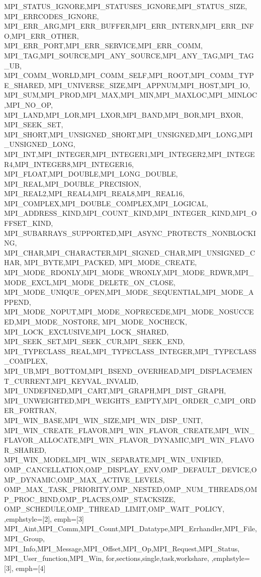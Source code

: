 {{    MPI_STATUS_IGNORE,MPI_STATUSES_IGNORE,MPI_STATUS_SIZE,
    MPI_ERRCODES_IGNORE,
    MPI_ERR_ARG,MPI_ERR_BUFFER,MPI_ERR_INTERN,MPI_ERR_INFO,MPI_ERR_OTHER,
    MPI_ERR_PORT,MPI_ERR_SERVICE,MPI_ERR_COMM,
    MPI_TAG,MPI_SOURCE,MPI_ANY_SOURCE,MPI_ANY_TAG,MPI_TAG_UB,
    MPI_COMM_WORLD,MPI_COMM_SELF,MPI_ROOT,MPI_COMM_TYPE_SHARED,
    MPI_UNIVERSE_SIZE,MPI_APPNUM,MPI_HOST,MPI_IO,
    MPI_SUM,MPI_PROD,MPI_MAX,MPI_MIN,MPI_MAXLOC,MPI_MINLOC,MPI_NO_OP,
    MPI_LAND,MPI_LOR,MPI_LXOR,MPI_BAND,MPI_BOR,MPI_BXOR,
    MPI_SEEK_SET,
    MPI_SHORT,MPI_UNSIGNED_SHORT,MPI_UNSIGNED,MPI_LONG,MPI_UNSIGNED_LONG,
    MPI_INT,MPI_INTEGER,MPI_INTEGER1,MPI_INTEGER2,MPI_INTEGER4,MPI_INTEGER8,MPI_INTEGER16,
    MPI_FLOAT,MPI_DOUBLE,MPI_LONG_DOUBLE,
    MPI_REAL,MPI_DOUBLE_PRECISION,
    MPI_REAL2,MPI_REAL4,MPI_REAL8,MPI_REAL16,
    MPI_COMPLEX,MPI_DOUBLE_COMPLEX,MPI_LOGICAL,
    MPI_ADDRESS_KIND,MPI_COUNT_KIND,MPI_INTEGER_KIND,MPI_OFFSET_KIND,
    MPI_SUBARRAYS_SUPPORTED,MPI_ASYNC_PROTECTS_NONBLOCKING,
    MPI_CHAR,MPI_CHARACTER,MPI_SIGNED_CHAR,MPI_UNSIGNED_CHAR,
    MPI_BYTE,MPI_PACKED, MPI_MODE_CREATE,
    MPI_MODE_RDONLY,MPI_MODE_WRONLY,MPI_MODE_RDWR,MPI_MODE_EXCL,MPI_MODE_DELETE_ON_CLOSE,
    MPI_MODE_UNIQUE_OPEN,MPI_MODE_SEQUENTIAL,MPI_MODE_APPEND,
    MPI_MODE_NOPUT,MPI_MODE_NOPRECEDE,MPI_MODE_NOSUCCEED,MPI_MODE_NOSTORE,
    MPI_MODE_NOCHECK, MPI_LOCK_EXCLUSIVE,MPI_LOCK_SHARED,
    MPI_SEEK_SET,MPI_SEEK_CUR,MPI_SEEK_END,
    MPI_TYPECLASS_REAL,MPI_TYPECLASS_INTEGER,MPI_TYPECLASS_COMPLEX,
    MPI_UB,MPI_BOTTOM,MPI_BSEND_OVERHEAD,MPI_DISPLACEMENT_CURRENT,MPI_KEYVAL_INVALID,
    MPI_UNDEFINED,MPI_CART,MPI_GRAPH,MPI_DIST_GRAPH,
    MPI_UNWEIGHTED,MPI_WEIGHTS_EMPTY,MPI_ORDER_C,MPI_ORDER_FORTRAN,
    MPI_WIN_BASE,MPI_WIN_SIZE,MPI_WIN_DISP_UNIT,
    MPI_WIN_CREATE_FLAVOR,MPI_WIN_FLAVOR_CREATE,MPI_WIN_FLAVOR_ALLOCATE,MPI_WIN_FLAVOR_DYNAMIC,MPI_WIN_FLAVOR_SHARED,
    MPI_WIN_MODEL,MPI_WIN_SEPARATE,MPI_WIN_UNIFIED,
    OMP_CANCELLATION,OMP_DISPLAY_ENV,OMP_DEFAULT_DEVICE,OMP_DYNAMIC,OMP_MAX_ACTIVE_LEVELS,
    OMP_MAX_TASK_PRIORITY,OMP_NESTED,OMP_NUM_THREADS,OMP_PROC_BIND,OMP_PLACES,OMP_STACKSIZE,
    OMP_SCHEDULE,OMP_THREAD_LIMIT,OMP_WAIT_POLICY,
  },emphstyle={[2]\color{green!40!black}},
  emph={[3] %
    MPI_Aint,MPI_Comm,MPI_Count,MPI_Datatype,MPI_Errhandler,MPI_File,MPI_Group,
    MPI_Info,MPI_Message,MPI_Offset,MPI_Op,MPI_Request,MPI_Status,
    MPI_User_function,MPI_Win,
    for,sections,single,task,workshare,
  },emphstyle={[3]\color{brown}\bfseries},
  emph={[4] %
}}
